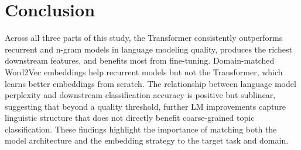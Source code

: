\documentclass[11pt]{article}
\begin{document}
\section{Conclusion}

Across all three parts of this study, the Transformer consistently outperforms recurrent and n-gram models in language modeling quality, produces the richest downstream features, and benefits most from fine-tuning. Domain-matched Word2Vec embeddings help recurrent models but not the Transformer, which learns better embeddings from scratch. The relationship between language model perplexity and downstream classification accuracy is positive but sublinear, suggesting that beyond a quality threshold, further LM improvements capture linguistic structure that does not directly benefit coarse-grained topic classification. These findings highlight the importance of matching both the model architecture and the embedding strategy to the target task and domain.
\end{document}
